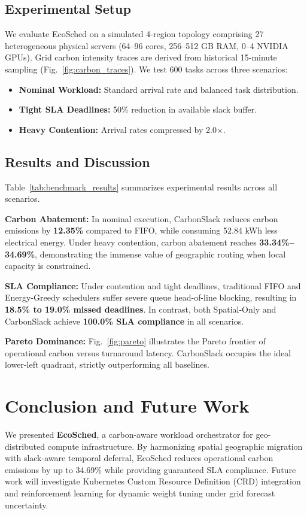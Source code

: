 \documentclass[conference]{IEEEtran}
\begin{document}
\subsection{Experimental Setup}
We evaluate EcoSched on a simulated 4-region topology comprising 27 heterogeneous physical servers (64--96 cores, 256--512 GB RAM, 0--4 NVIDIA GPUs). Grid carbon intensity traces are derived from historical 15-minute sampling (Fig.~\ref{fig:carbon_traces}). We test 600 tasks across three scenarios:
\begin{itemize}
    \item \textbf{Nominal Workload:} Standard arrival rate and balanced task distribution.
    \item \textbf{Tight SLA Deadlines:} 50\% reduction in available slack buffer.
    \item \textbf{Heavy Contention:} Arrival rates compressed by 2.0$\times$.
\end{itemize}

\subsection{Results and Discussion}
Table~\ref{tab:benchmark_results} summarizes experimental results across all scenarios.

\textbf{Carbon Abatement:} In nominal execution, CarbonSlack reduces carbon emissions by \textbf{12.35\%} compared to FIFO, while consuming 52.84 kWh less electrical energy. Under heavy contention, carbon abatement reaches \textbf{33.34\%--34.69\%}, demonstrating the immense value of geographic routing when local capacity is constrained.

\textbf{SLA Compliance:} Under contention and tight deadlines, traditional FIFO and Energy-Greedy schedulers suffer severe queue head-of-line blocking, resulting in \textbf{18.5\% to 19.0\% missed deadlines}. In contrast, both Spatial-Only and CarbonSlack achieve \textbf{100.0\% SLA compliance} in all scenarios.

\textbf{Pareto Dominance:} Fig.~\ref{fig:pareto} illustrates the Pareto frontier of operational carbon versus turnaround latency. CarbonSlack occupies the ideal lower-left quadrant, strictly outperforming all baselines.

\section{Conclusion and Future Work}
We presented \textbf{EcoSched}, a carbon-aware workload orchestrator for geo-distributed compute infrastructure. By harmonizing spatial geographic migration with slack-aware temporal deferral, EcoSched reduces operational carbon emissions by up to 34.69\% while providing guaranteed SLA compliance. Future work will investigate Kubernetes Custom Resource Definition (CRD) integration and reinforcement learning for dynamic weight tuning under grid forecast uncertainty.



\end{document}

